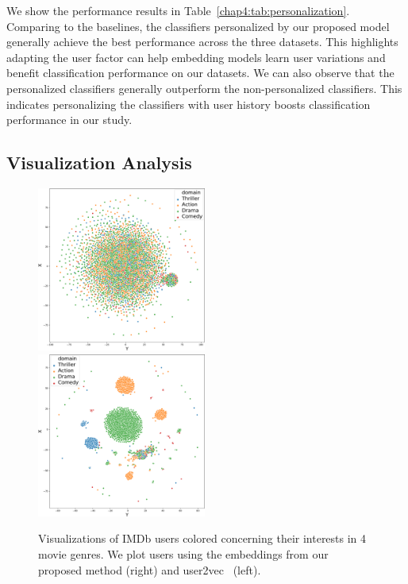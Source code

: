 We show the performance results in Table~\ref{chap4:tab:personalization}. Comparing to the baselines, the classifiers personalized by our proposed model generally achieve the best performance across the three datasets. 
This highlights adapting the user factor can help embedding models learn user variations and benefit classification performance on our datasets.
We can also observe that the personalized classifiers generally outperform the non-personalized classifiers.
This indicates personalizing the classifiers with user history boosts classification performance in our study.



\subsection{Visualization Analysis}

\begin{figure}[t!]
\centering
\includegraphics[width=0.495\textwidth]{./images/chapter4/uembedding/user2vec_emb_viz.pdf}
\includegraphics[width=0.495\textwidth]{./images/chapter4/uembedding/ours_emb_viz.pdf}
\caption{Visualizations of IMDb users colored concerning their interests in 4 movie genres. We plot users using the embeddings from our proposed method (right) and user2vec~\cite{amir2017quantifying} (left).}
\label{chap4:fig:uemb_viz}
\end{figure}

